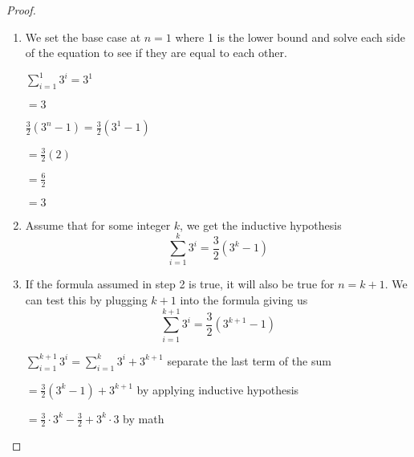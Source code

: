 \documentclass{article}
\begin{document}
      \begin{proof}

        \begin{enumerate}
          \item We set the base case at $n=1$ where 1 is the lower bound 
          and solve each side of the equation to see if they are equal to 
          each other.

            $\sum\limits_{i=1}^{1} 3^i = 3^1$

            \hspace{1cm}$= 3$
            
            \vspace{0.25cm}

            $\frac{3}{2} (3^n-1) = \frac{3}{2} (3^1-1)$ 
            \vspace{.25cm}

            \hspace{1cm}$= \frac{3}{2} (2)$
            \vspace{.25cm}

            \hspace{1cm}$= \frac{6}{2}$
            \vspace{.25cm}

            \hspace{1cm}$= 3$

          \item Assume that for some integer $k$, we get the inductive hypothesis
            \[\sum\limits_{i=1}^{k} 3^i = \frac{3}{2} (3^k-1)\]

        \item If the formula assumed in step 2 is true, it will also 
        be true for $n = k+1$. We can test this by plugging $k+1$ into
        the formula giving us \[\sum\limits_{i=1}^{k+1} 3^i = \frac{3}{2} (3^{k+1}-1)\]
        
          $\sum\limits_{i=1}^{k+1} 3^i =\sum\limits_{i=1}^{k} 3^i + 3^{k+1}$
          \hspace{1.5cm} separate the last term of the sum
          \vspace{.25cm}

          \hspace{1cm}$= \frac{3}{2} (3^k-1) + 3^{k+1}$
          \hspace{.75cm} by applying inductive hypothesis
          \vspace{.25cm}

          \hspace{1cm}$= \frac{3}{2} \cdot 3^k - \frac{3}{2} + 3^k \cdot 3$
          \hspace{.65cm} by math
          \vspace{.5cm}
          

\end{enumerate}
\end{proof}
\end{document}
